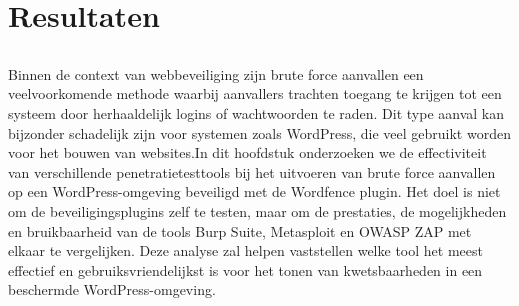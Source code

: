 
\chapter{Resultaten}%
\label{ch:resultaten}

\section{}
\subsection{}
\subsection{}

\section{}
\subsection{}
\subsection{}

\section{}
Binnen de context van webbeveiliging zijn brute force aanvallen een veelvoorkomende methode waarbij aanvallers trachten toegang te krijgen tot een systeem 
door herhaaldelijk logins of wachtwoorden te raden. Dit type aanval kan bijzonder schadelijk zijn voor systemen zoals WordPress, die veel 
gebruikt worden voor het bouwen van websites.In dit hoofdstuk onderzoeken we de effectiviteit van verschillende penetratietesttools bij het uitvoeren van 
brute force aanvallen op een WordPress-omgeving beveiligd met de Wordfence plugin. Het doel is niet om de beveiligingsplugins zelf te testen, maar om de 
prestaties, de mogelijkheden en bruikbaarheid van de tools Burp Suite, Metasploit en OWASP ZAP met elkaar te vergelijken. Deze analyse zal helpen vaststellen welke tool 
het meest effectief en gebruiksvriendelijkst is voor het tonen van kwetsbaarheden in een beschermde WordPress-omgeving.

